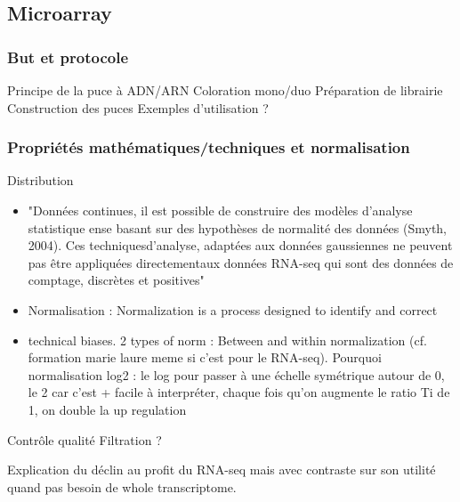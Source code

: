 


\subsection{Microarray}

\subsubsection{But et protocole}

Principe de la puce à ADN/ARN
Coloration mono/duo
Préparation de librairie
Construction des puces
Exemples d'utilisation ?

\subsubsection{Propriétés mathématiques/techniques et normalisation}
\label{subsubsection:microarray_props_and_normalisation}

Distribution
\begin{itemize}
\item  "Données continues, il est possible de construire des modèles d’analyse statistique ense basant sur des hypothèses de normalité des données (Smyth, 2004). Ces techniquesd’analyse, adaptées aux données gaussiennes ne peuvent pas être appliquées directementaux données RNA-seq qui sont des données de comptage, discrètes et positives" %
\item     Normalisation : Normalization is a process designed to identify and correct
\item technical biases. 2 types of norm : Between and within normalization (cf. formation marie laure meme si c'est pour le RNA-seq). Pourquoi normalisation log2 : le log pour passer à une échelle symétrique autour de 0, le 2 car c'est + facile à interpréter, chaque fois qu'on augmente le ratio Ti de 1, on double la up regulation  
\end{itemize}
Contrôle qualité
Filtration ?


Explication du déclin au profit du RNA-seq mais avec contraste sur son utilité quand pas besoin de whole transcriptome.



